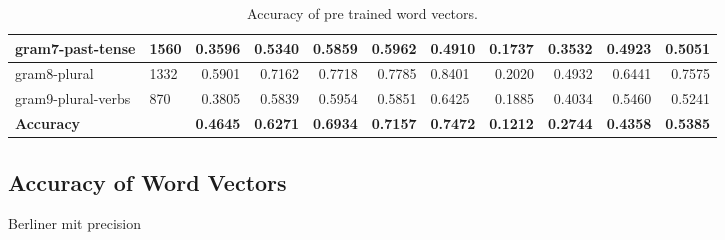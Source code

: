 \begin{landscape}
\begin{table}
\begin{tabular}{l|R{2.5cm}|r|r|r|r|R{2.5cm}|r|r|r|r}
gram7-past-tense & 1560 & 0.3596 & 0.5340 & 0.5859 & 0.5962 & 0.4910 & 0.1737 & 0.3532 & 0.4923 & 0.5051 \\ \hline
gram8-plural & 1332 & 0.5901 & 0.7162 & 0.7718 & 0.7785 & 0.8401 & 0.2020 & 0.4932 & 0.6441 & 0.7575 \\ \hline
gram9-plural-verbs & 870 & 0.3805 & 0.5839 & 0.5954 & 0.5851 & 0.6425 & 0.1885 & 0.4034 & 0.5460 & 0.5241 \\ \hline
\textbf{Accuracy} &  & \textbf{0.4645} & \textbf{0.6271} & \textbf{0.6934} & \textbf{0.7157} & \textbf{0.7472} & \textbf{0.1212} & \textbf{0.2744} & \textbf{0.4358} & \textbf{0.5385} \\ \hline
\end{tabular}
\caption{Accuracy of pre trained word vectors.}
\end{table}
\end{landscape}

\subsection{Accuracy of Word Vectors}

{\Huge Berliner mit precision}